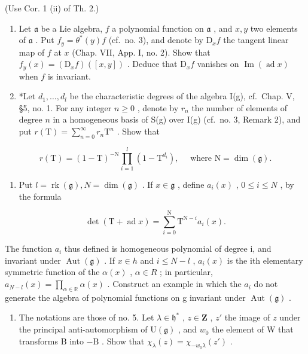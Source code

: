 (Use Cor. 1 (ii) of Th. 2.)

\begin{enumerate}
\def\labelenumi{\arabic{enumi})}
\setcounter{enumi}{5}
\item
  Let \(\mathfrak{a}\) be a Lie algebra, \(f\) a polynomial function on \(\mathfrak{a}\) , and \(x, y\) two elements of \(\mathfrak{a}\) . Put \(f_y = \theta^*(y)f\) (cf.~no. 3), and denote by \(\mathrm{D}_x f\) the tangent linear map of \(f\) at \(x\) (Chap. VII, App. I, no. 2). Show that \(f_y(x) = (\mathrm{D}_xf)([x,y])\) . Deduce that \(\mathrm{D}_xf\) vanishes on \(\operatorname{Im}(\operatorname{ad}x)\) when \(f\) is invariant.
\item
  *Let \(d_1, \ldots, d_l\) be the characteristic degrees of the algebra I(g), cf.~Chap. V, §5, no. 1. For any integer \(n \geq 0\) , denote by \(r_n\) the number of elements of degree \(n\) in a homogeneous basis of S(g) over I(g) (cf.~no. 3, Remark 2), and put \(r(\mathrm{T}) = \sum_{n=0}^{\infty} r_n \mathrm{T}^n\) . Show that
\end{enumerate}

\[
r (\mathrm{T}) = (1 - \mathrm{T}) ^ {- \mathrm{N}} \prod_ {i = 1} ^ {l} (1 - \mathrm{T} ^ {d _ {i}}), \quad \text { where } \mathrm{N} = \dim (\mathfrak {g}).
\]

\begin{enumerate}
\def\labelenumi{\arabic{enumi})}
\setcounter{enumi}{7}
\tightlist
\item
  Put \(l = \operatorname{rk}(\mathfrak{g}), N = \dim(\mathfrak{g})\) . If \(x \in \mathfrak{g}\) , define \(a_i(x)\) , \(0 \leq i \leq N\) , by the formula
\end{enumerate}

\[
\det (\mathrm{T} + \operatorname{ad} x) = \sum_ {i = 0} ^ {\mathrm{N}} \mathrm{T} ^ {\mathrm{N} - i} a _ {i} (x).
\]

The function \(a_{i}\) thus defined is homogeneous polynomial of degree i, and invariant under \(\operatorname{Aut}(\mathfrak{g})\) . If \(x \in h\) and \(i \leq N - l\) , \(a_{i}(x)\) is the ith elementary symmetric function of the \(\alpha(x)\) , \(\alpha \in R\) ; in particular, \(a_{N-l}(x) = \prod_{\alpha \in \mathbb{R}} \alpha(x)\) . Construct an example in which the \(a_{i}\) do not generate the algebra of polynomial functions on g invariant under \(\operatorname{Aut}(\mathfrak{g})\) .

\begin{enumerate}
\def\labelenumi{\arabic{enumi})}
\setcounter{enumi}{8}
\tightlist
\item
  The notations are those of no. 5. Let \(\lambda \in \mathfrak{h}^*\) , \(z \in \mathbf{Z}\) , \(z'\) the image of \(z\) under the principal anti-automorphism of \(\mathrm{U}(\mathfrak{g})\) , and \(w_0\) the element of W that transforms B into \(-\mathrm{B}\) . Show that \(\chi_{\lambda}(z) = \chi_{-w_0\lambda}(z')\) .
\end{enumerate}

